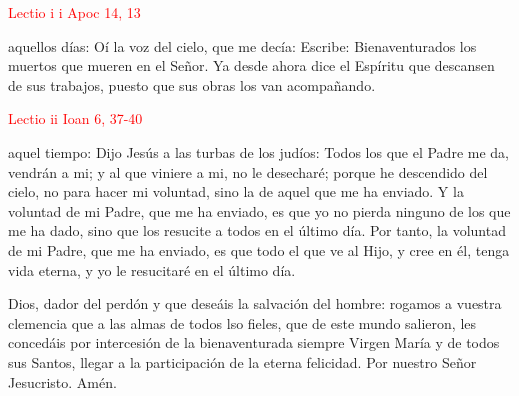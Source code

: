 \noindent\textcolor{red}{Lectio i \hfill i Apoc 14, 13}

aquellos días: Oí la voz del cielo, que me decía: Escribe: Bienaventurados los muertos que mueren en el Señor. Ya desde ahora dice el Espíritu que descansen
de sus trabajos, puesto que sus obras los van acompañando.

\vspace{2mm}

\noindent\textcolor{red}{Lectio ii \hfill Ioan 6, 37-40}

aquel tiempo: Dijo Jesús a las turbas de los judíos: Todos los que el Padre me da, vendrán a mi; y al que viniere a mi, no le desecharé; porque he descendido
del cielo, no para hacer mi voluntad, sino la de aquel que me ha enviado. Y la voluntad de mi Padre, que me ha enviado, es que yo no pierda ninguno de los que
me ha dado, sino que los resucite a todos en el último día. Por tanto, la voluntad de mi Padre, que me ha enviado, es que todo el que ve al Hijo, y cree en él,
tenga vida eterna, y yo le resucitaré en el último día.

\vspace{2mm}

\begin{otherlanguage}{latin}
      

      \vspace{1mm}

      
\end{otherlanguage}

\vspace{2mm}

Dios, dador del perdón y que deseáis la salvación del hombre: rogamos a vuestra clemencia que a las almas de todos lso fieles, que de este mundo salieron,
les concedáis por intercesión de la bienaventurada siempre Virgen María y de todos sus Santos, llegar a la participación de la eterna felicidad. Por nuestro
Señor Jesucristo. Amén.

\begin{otherlanguage}{latin}
      

      \vspace{1mm}

      
\end{otherlanguage}